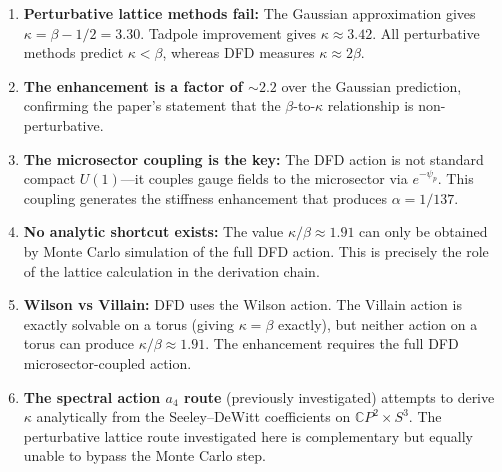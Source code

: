 \documentclass[11pt]{article}
\begin{document}
\begin{enumerate}
\item \textbf{Perturbative lattice methods fail:} The Gaussian approximation
  gives $\kappa = \beta - 1/2 = 3.30$.  Tadpole improvement gives
  $\kappa \approx 3.42$.  All perturbative methods predict $\kappa < \beta$,
  whereas DFD measures $\kappa \approx 2\beta$.

\item \textbf{The enhancement is a factor of $\sim\!2.2$} over the Gaussian
  prediction, confirming the paper's statement that the $\beta$-to-$\kappa$
  relationship is non-perturbative.

\item \textbf{The microsector coupling is the key:} The DFD action
  is not standard compact $U(1)$---it couples gauge fields to the
  microsector via $e^{-\psi_p}$.  This coupling generates the
  stiffness enhancement that produces $\alpha = 1/137$.

\item \textbf{No analytic shortcut exists:} The value $\kappa/\beta \approx 1.91$
  can only be obtained by Monte Carlo simulation of the full DFD action.
  This is precisely the role of the lattice calculation in the derivation chain.

\item \textbf{Wilson vs Villain:} DFD uses the Wilson action.
  The Villain action is exactly solvable on a torus (giving $\kappa = \beta$
  exactly), but neither action on a torus can produce $\kappa/\beta \approx 1.91$.
  The enhancement requires the full DFD microsector-coupled action.

\item \textbf{The spectral action $a_4$ route} (previously investigated)
  attempts to derive $\kappa$ analytically from the Seeley--DeWitt
  coefficients on $\mathbb{C}P^2 \times S^3$.  The perturbative lattice
  route investigated here is complementary but equally unable to bypass
  the Monte Carlo step.
\end{enumerate}
\end{document}
